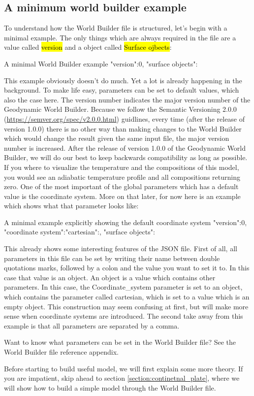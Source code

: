 \documentclass{book}
\newcommand{\GWB}{{Geodynamic World Builder}}
\newcommand{\WB}{{World Builder}}
\begin{document}
\subsection{A minimum world builder example}
To understand how the \WB{} file is structured, let's begin with a minimal example. The only things which are always required in the file are a value called \hl{version} and a object called \hl{Surface ojbects}:

\begin{bashcode}{A minimal \WB{} example}
"version":0,
"surface objects":{}
\end{bashcode}

This example obviously doesn't do much. Yet a lot is already happening in the background. To make life easy, parameters can be set to default values, which also the case here. The version number indicates the major version number of the \GWB{}. Because we follow the Semantic Versioning 2.0.0 (\url{https://semver.org/spec/v2.0.0.html}) guidlines, every time (after the release of version 1.0.0) there is no other way than making changes to the \WB{} which would change the result given the same input file, the major version number is increased. After the release of version 1.0.0 of the \GWB{}, we will do our best to keep backwards compatibility as long as possible.
\\
If you where to visualize the temperature and the compositions of this model, you would see an adiabatic temperature profile and all compositions returning zero. One of the most important of the global parameters which has a default value is the coordinate system. More on that later, for now here is an example which shows what that parameter looks like:

\begin{bashcode}[label={lst:code_minimal_example_default_coordinate_system}]{A minimal example explicitly showing the default coordinate system}
"version":0,
"coordinate system":{"cartesian":{}},
"surface objects":{}
\end{bashcode}

This already shows some interesting features of the JSON file. First of all, all parameters in this file can be set by writing their name between double quotations marks, followed by a colon and the value you want to set it to. In this case that value is an object. An object is a value which contains other parameters. In this case, the Coordinate\_system parameter is set to an object, which contains the parameter called cartesian, which is set to a value which is an empty object. This construction may seem confusing at first, but will make more sense when coordinate systems are introduced. The second take away from this example is that all parameters are separated by a comma.
\begin{remark}
Want to know what parameters can be set in the \WB{} file? See the \WB{} file reference appendix.
\end{remark}
\begin{remark}
Before starting to build useful model, we will first explain some more theory. If you are impatient, skip ahead to section \ref{section:continetnal_plate}, where we will show how to build a simple model through the \WB{} file. 
\end{remark}
\end{document}
